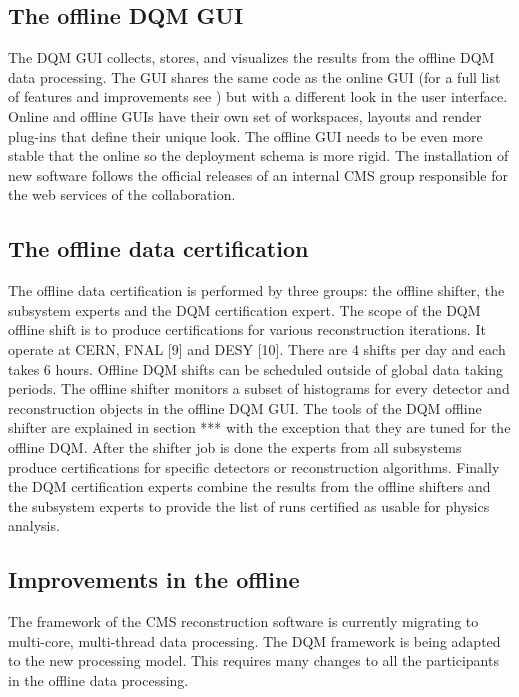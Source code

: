 \documentclass[journal]{IEEEtran}
\begin{document}
\subsection{The offline DQM GUI}
The DQM GUI collects, stores, and visualizes the results from the offline DQM data processing. The GUI shares the same code as the online GUI (for a full list of features and improvements see ) but with a different look in the user interface. Online and offline GUIs have their own set of workspaces, layouts and render plug-ins that define their unique look. The offline GUI needs to be even more stable that the online so the deployment schema is more rigid. The installation of new software follows the official releases of an internal CMS group responsible for the web services of the collaboration.

\subsection{The offline data certification}
The offline data certification is performed by three groups: the offline shifter, the subsystem experts and the DQM certification expert. The scope of the DQM offline shift is to produce certifications for various reconstruction iterations. It operate at CERN, FNAL [9] and DESY [10]. There are 4 shifts per day and each takes 6 hours. Offline DQM shifts can be scheduled outside of global data taking periods. The offline shifter monitors a subset of histograms for every detector and reconstruction objects in the offline DQM GUI. The tools of the DQM offline shifter are explained in section *** with the exception that they are tuned for the offline DQM. After the shifter job is done the experts from all subsystems produce certifications for specific detectors or reconstruction algorithms. Finally the DQM certification experts combine the results from the offline shifters and the subsystem experts to provide the list of runs certified as usable for physics analysis.

\subsection{Improvements in the offline}
The framework of the CMS reconstruction software is currently migrating to multi-core, multi-thread data processing. The DQM framework is being adapted to the new processing model. This requires many changes to all the participants in the offline data processing.
\end{document}
